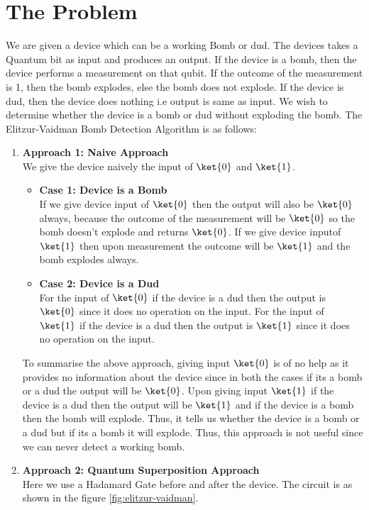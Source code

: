 \documentclass[12pt, oneside]{book}
\theoremstyle{definition}
\theoremstyle{definition}
\theoremstyle{remark}
\begin{document}
\section{The Problem}
We are given a device which can be a working Bomb or dud. The devices takes a Quantum bit as input and produces an output.
If the device is a bomb, then the device performs a measurement on that qubit. If the outcome of the measurement is 1, then the bomb explodes, else the bomb does not explode.
If the device is dud, then the device does nothing i.e output is same as input.
We wish to determine whether the device is a bomb or dud without exploding the bomb. The Elitzur-Vaidman Bomb Detection Algorithm is as follows:
\begin{enumerate}
    \item \textbf{Approach 1: Naive Approach }\\We give the device naively the input of $\ket{0}$ and $\ket{1}$. 
    \begin{itemize} 
        \item \textbf{Case 1: Device is a Bomb}\\
        If we give device input of $\ket{0}$ then the output will also be $\ket{0}$ always, because the outcome of the measurement will be $\ket{0}$ so the bomb doesn't explode and returns $\ket{0}$. 
        If we give device inputof $\ket{1}$ then upon measurement the outcome will be $\ket{1}$ and the bomb explodes always.
        \item \textbf{Case 2: Device is a Dud}\\
        For the input of $\ket{0}$ if the device is a dud then the output is $\ket{0}$ since it does no operation on the input.
        For the input of $\ket{1}$ if the device is a dud then the output is $\ket{1}$ since it does no operation on the input.
    \end{itemize}
    To summarise the above approach, giving input $\ket{0}$ is of no help as it provides no information about the device since in both the cases if its a bomb or a dud the output will be $\ket{0}$. 
    Upon giving input $\ket{1}$ if the device is a dud then the output will be $\ket{1}$ and if the device is a bomb then the bomb will explode. Thus, it tells us whether the device is a bomb or a dud but if its a bomb it will explode. Thus, this approach is not useful since we can never detect a working bomb.
    \item \textbf{Approach 2: Quantum Superposition Approach}\\
    Here we use a Hadamard Gate before and after the device. The circuit is as shown in the figure \ref{fig:elitzur-vaidman}.

\end{enumerate}
\end{document}

